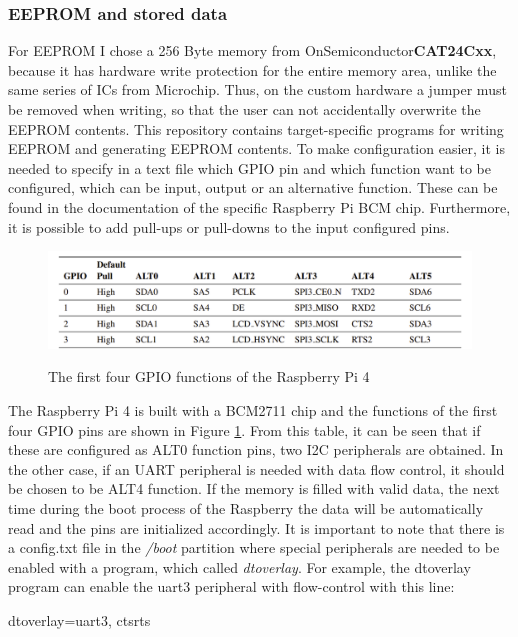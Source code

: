 \subsubsection{EEPROM and stored data}
For EEPROM I chose a 256 \si{\kilo}Byte memory from OnSemiconductor\newline \textbf{CAT24Cxx}, because it has hardware write protection for the entire memory area, unlike the same series of ICs from Microchip. Thus, on the custom hardware a jumper must be removed when writing, so that the user can not accidentally overwrite the EEPROM contents.
This repository contains target-specific programs for writing EEPROM and generating EEPROM contents. To make configuration easier, it is needed to specify in a text file which GPIO pin and which function want to be configured, which can be input, output or an alternative function. These can be found in the documentation of the specific Raspberry Pi BCM chip. Furthermore, it is possible to add pull-ups or pull-downs to the input configured pins.
\begin{figure}[!htb]
    \centering
    \includegraphics[width=\textwidth]{img/bcmgpio.png}
    \caption{The first four GPIO functions of the Raspberry Pi 4}
    \label{fig:gpios}
    \cite{RaspberryBCM}
\end{figure}
The Raspberry Pi 4 is built with a BCM2711 chip and the functions of the first four GPIO pins are shown in Figure \ref{fig:gpios}. From this table, it can be seen that if these are configured as ALT0 function pins, two I2C peripherals are obtained. In the other case, if an UART peripheral is needed with data flow control, it should be chosen to be ALT4 function.
If the memory is filled with valid data, the next time during the boot process of the Raspberry the data will be automatically read and the pins are initialized accordingly. It is important to note that there is a config.txt file in the \textit{/boot} partition where special peripherals are needed to be enabled with a program, which called \textit{dtoverlay}. For example, the dtoverlay program can enable the uart3 peripheral with flow-control with this line:
\begin{center}
    dtoverlay=uart3, ctsrts
\end{center}


